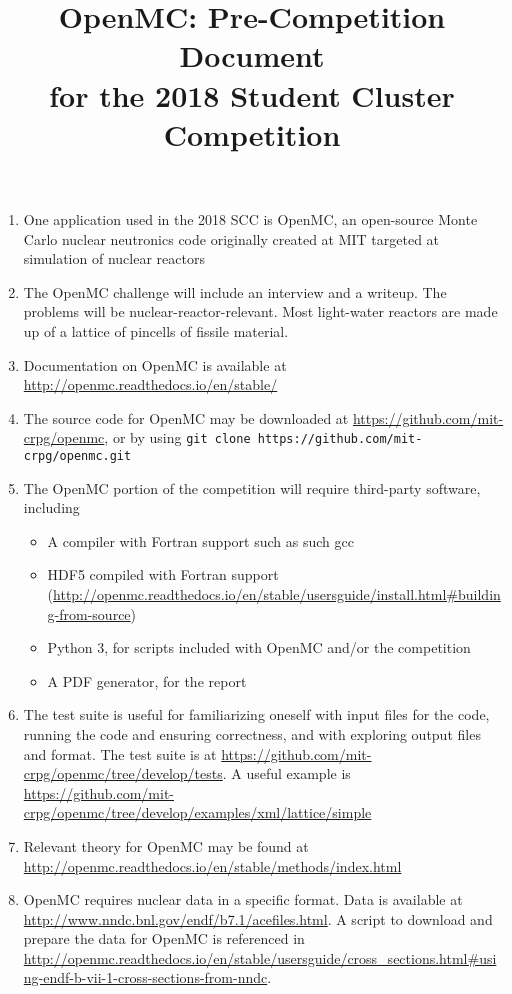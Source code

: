 \documentclass[10pt]{article}
\begin{document}
\title{OpenMC: Pre-Competition Document \\for the 2018 Student Cluster Competition}

\maketitle

\begin{enumerate}
\item One application used in the 2018 SCC is OpenMC, an open-source Monte Carlo nuclear neutronics code originally created at MIT targeted at simulation of nuclear reactors
\item The OpenMC challenge will include an interview and a writeup. The problems will be nuclear-reactor-relevant. Most light-water reactors are made up of a lattice of pincells of fissile material.
\item Documentation on OpenMC is available at \url{http://openmc.readthedocs.io/en/stable/}
\item The source code for OpenMC may be downloaded at \url{https://github.com/mit-crpg/openmc}, or by using \linebreak\verb+git clone https://github.com/mit-crpg/openmc.git+
\item The OpenMC portion of the competition will require third-party software, including
    \begin{itemize}
    \item A compiler with Fortran support such as such gcc
     \item HDF5 compiled with Fortran support \\(\url{http://openmc.readthedocs.io/en/stable/usersguide/install.html#building-from-source})
     \item Python 3, for scripts included with OpenMC and/or the competition
     \item A PDF generator, for the report
    \end{itemize}
\item The test suite is useful for familiarizing oneself with input files for the code, running the code and ensuring correctness, and with exploring output files and format. The test suite is at \url{https://github.com/mit-crpg/openmc/tree/develop/tests}. A useful example is  \url{https://github.com/mit-crpg/openmc/tree/develop/examples/xml/lattice/simple}
\item Relevant theory for OpenMC may be found at \url{http://openmc.readthedocs.io/en/stable/methods/index.html}
\item OpenMC requires nuclear data in a specific format. Data is available at \url{http://www.nndc.bnl.gov/endf/b7.1/acefiles.html}. A script to download and prepare the data for OpenMC is referenced in {\footnotesize\url{http://openmc.readthedocs.io/en/stable/usersguide/cross_sections.html#using-endf-b-vii-1-cross-sections-from-nndc}}.

\end{enumerate}
\end{document}
